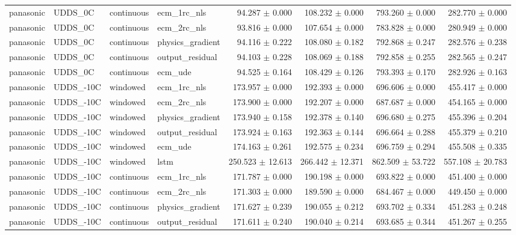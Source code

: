 \begin{longtable}{llllrrrr}
panasonic & UDDS\_0C & continuous & ecm\_1rc\_nls & 94.287 $\pm$ 0.000 & 108.232 $\pm$ 0.000 & 793.260 $\pm$ 0.000 & 282.770 $\pm$ 0.000 \\
panasonic & UDDS\_0C & continuous & ecm\_2rc\_nls & 93.816 $\pm$ 0.000 & 107.654 $\pm$ 0.000 & 783.828 $\pm$ 0.000 & 280.949 $\pm$ 0.000 \\
panasonic & UDDS\_0C & continuous & physics\_gradient & 94.116 $\pm$ 0.222 & 108.080 $\pm$ 0.182 & 792.868 $\pm$ 0.247 & 282.576 $\pm$ 0.238 \\
panasonic & UDDS\_0C & continuous & output\_residual & 94.103 $\pm$ 0.228 & 108.069 $\pm$ 0.188 & 792.858 $\pm$ 0.255 & 282.565 $\pm$ 0.247 \\
panasonic & UDDS\_0C & continuous & ecm\_ude & 94.525 $\pm$ 0.164 & 108.429 $\pm$ 0.126 & 793.393 $\pm$ 0.170 & 282.926 $\pm$ 0.163 \\
panasonic & UDDS\_-10C & windowed & ecm\_1rc\_nls & 173.957 $\pm$ 0.000 & 192.393 $\pm$ 0.000 & 696.606 $\pm$ 0.000 & 455.417 $\pm$ 0.000 \\
panasonic & UDDS\_-10C & windowed & ecm\_2rc\_nls & 173.900 $\pm$ 0.000 & 192.207 $\pm$ 0.000 & 687.687 $\pm$ 0.000 & 454.165 $\pm$ 0.000 \\
panasonic & UDDS\_-10C & windowed & physics\_gradient & 173.940 $\pm$ 0.158 & 192.378 $\pm$ 0.140 & 696.680 $\pm$ 0.275 & 455.396 $\pm$ 0.204 \\
panasonic & UDDS\_-10C & windowed & output\_residual & 173.924 $\pm$ 0.163 & 192.363 $\pm$ 0.144 & 696.664 $\pm$ 0.288 & 455.379 $\pm$ 0.210 \\
panasonic & UDDS\_-10C & windowed & ecm\_ude & 174.163 $\pm$ 0.261 & 192.575 $\pm$ 0.234 & 696.759 $\pm$ 0.294 & 455.508 $\pm$ 0.335 \\
panasonic & UDDS\_-10C & windowed & lstm & 250.523 $\pm$ 12.613 & 266.442 $\pm$ 12.371 & 862.509 $\pm$ 53.722 & 557.108 $\pm$ 20.783 \\
panasonic & UDDS\_-10C & continuous & ecm\_1rc\_nls & 171.787 $\pm$ 0.000 & 190.198 $\pm$ 0.000 & 693.822 $\pm$ 0.000 & 451.400 $\pm$ 0.000 \\
panasonic & UDDS\_-10C & continuous & ecm\_2rc\_nls & 171.303 $\pm$ 0.000 & 189.590 $\pm$ 0.000 & 684.467 $\pm$ 0.000 & 449.450 $\pm$ 0.000 \\
panasonic & UDDS\_-10C & continuous & physics\_gradient & 171.627 $\pm$ 0.239 & 190.055 $\pm$ 0.212 & 693.702 $\pm$ 0.334 & 451.283 $\pm$ 0.248 \\
panasonic & UDDS\_-10C & continuous & output\_residual & 171.611 $\pm$ 0.240 & 190.040 $\pm$ 0.214 & 693.685 $\pm$ 0.344 & 451.267 $\pm$ 0.255 \\

\end{longtable}
